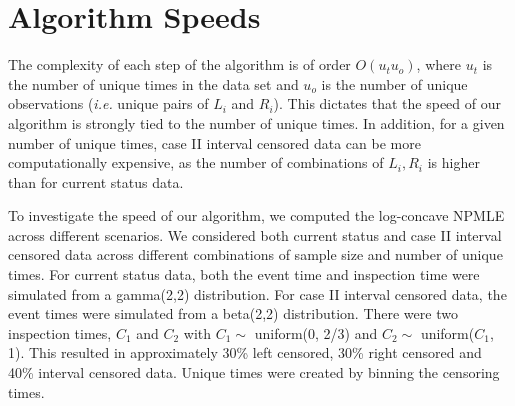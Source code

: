 {\section{Algorithm Speeds}  
\label{sec:AlgSpd}	}

	The complexity of each step of the algorithm is of order $O(u_t u_o)$, where $u_t$ is the number of unique times in the data set and $u_o$ is the number of unique observations (\emph{i.e.} unique pairs of $L_i$ and $R_i$). This dictates that the speed of our algorithm is strongly tied to the number of unique times. In addition, for a given number of unique times, case II interval censored data can be more computationally expensive, as the number of combinations of $L_i, R_i$ is higher than for current status data. 

	To investigate the speed of our algorithm, we computed the log-concave NPMLE across different scenarios. We considered both current status and case II interval censored data across different combinations of sample size and number of unique times. For current status data, both the event time and inspection time were simulated from a gamma(2,2) distribution. For case II interval censored data, the event times were simulated from a beta(2,2) distribution. There were two inspection times, $C_1$ and $C_2$ with $C_1 \sim $ uniform(0, 2/3) and $C_2 \sim$ uniform($C_1$, 1). This resulted in approximately 30\% left censored, 30\% right censored and 40\% interval censored data. Unique times were created by binning the censoring times. 
	
	
